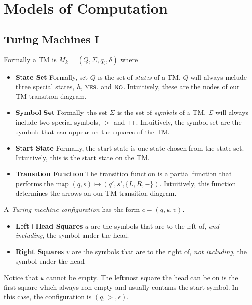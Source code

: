 
\chapter{Models of Computation}



\section{Turing Machines I}

Formally a TM is $M_k = (Q,\Sigma,q_0,\delta)$ 
where 

\begin{itemize}   
\renewcommand{\labelitemi}{$\Box$}
\item \textbf{State Set} Formally, set $Q$ is the set of \textit{states} of a TM. 
$Q$ will always include three special states, $h$, $\textsc{yes}$.
and $\textsc{no}$. Intuitively, these are the nodes of our TM transition diagram.
%
\item \textbf{Symbol Set} Formally, the set $\Sigma$ is 
the set of \textit{symbols} of a TM. 
$\Sigma$ will always include two special symbols, $>$ and $\Box$.
Intuitively, the symbol set are the symbols that can appear on the squares of the TM.
%
\item \textbf{Start State} Formally, the start state is one state chosen 
from the state set. 
Intuitively, this is the start state on the TM. 
%
\item \textbf{Transition Function} The transition function is a partial function 
that performs the map $(q,s) \mapsto (q',s',\{L,R,-\})$.
Intuitively, this function determines the arrows on our TM transition diagram.
\end{itemize} 

\frmrule


A \textit{Turing machine configuration} has the form $c = (q,u,v)$. 

\begin{itemize}   
\renewcommand{\labelitemi}{$\Box$}
\item \textbf{Left+Head Squares} $u$ are the symbols that are to the left of, 
\textit{and including}, the symbol under the head.
%
\item \textbf{Right Squares} $v$ are the symbols that are to the right of, 
\textit{not including}, the symbol under the head.
\end{itemize}

Notice that $u$ cannot be empty. The leftmost square the head can be on is 
the first square which always non-empty and usually 
contains the start symbol. In this case, 
the configuration is $(q,>,\epsilon)$.

